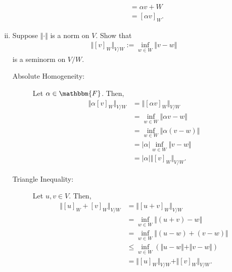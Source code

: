 \documentclass[10pt]{extarticle}
\begin{document}
\begin{enumerate}[(i)]
\begin{description}
\begin{align*}
                            &= \alpha v + W\\
                            &= [\alpha v]_W.
            \end{align*}
        \end{description}
      \item Suppose $\Vert \cdot \Vert$ is a norm on $V$. Show that
        \begin{align*}
          \Vert [v]_W\Vert_{V/W} := \inf_{w\in W}\Vert v-w\Vert
        \end{align*}
        is a seminorm on $V/W$.
        \begin{description}
          \item[Absolute Homogeneity:] Let $\alpha\in \mathbbm{F}$. Then,
            \begin{align*}
              \Vert \alpha[v]_{W}\Vert_{V/W} &= \Vert [\alpha v]_{W}\Vert_{V/W}\\
                                            &= \inf_{w\in W}\Vert \alpha v - w\Vert\\
                                            &= \inf_{w\in W}\Vert \alpha (v-w)\Vert \tag*{$W$ subspace}\\
                                            &= |\alpha|\inf_{w\in W}\Vert v-w\Vert\\
                                            &= |\alpha|\Vert [v]_{W}\Vert_{V/W}.
            \end{align*}
          \item[Triangle Inequality:] Let $u,v\in V$. Then,
            \begin{align*}
              \Vert [u]_{W} + [v]_{W}\Vert_{V/W} &= \Vert [u+v]_{W}\Vert_{V/W}\\
                                                 &= \inf_{w\in W}\Vert (u+v) - w \Vert\\
                                                 &= \inf_{w\in W}\Vert (u-w) + (v-w)\Vert \tag*{$W$ subspace}\\
                                                 &\leq \inf_{w\in W}\left(\Vert u-w\Vert + \Vert v-w\Vert\right)\\
                                                 &= \Vert[u]_{W}\Vert_{V/W} + \Vert[v]_{W}\Vert_{V/W}.
            \end{align*}
        \end{description}
    \end{enumerate}
\end{document}
